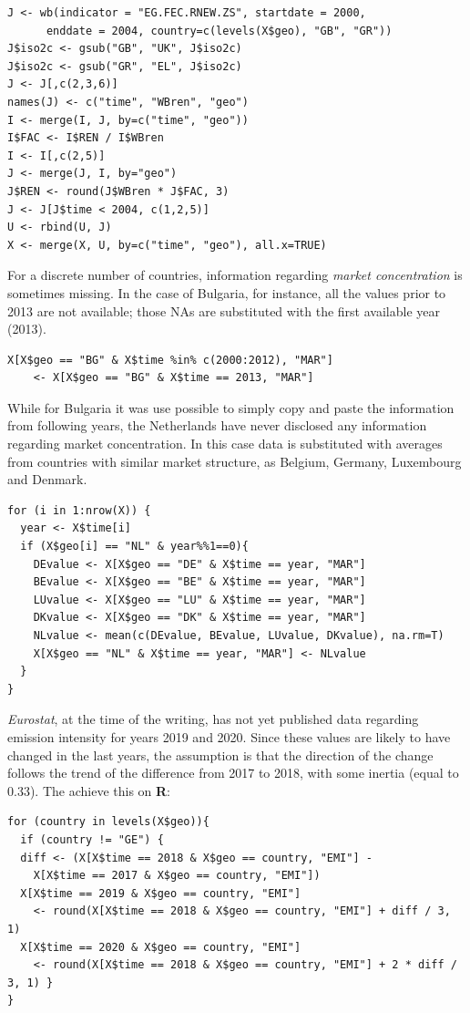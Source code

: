 \documentclass{book}
\begin{document}
\begin{appendices}
\begin{verbatim}
J <- wb(indicator = "EG.FEC.RNEW.ZS", startdate = 2000, 
	  enddate = 2004, country=c(levels(X$geo), "GB", "GR"))
J$iso2c <- gsub("GB", "UK", J$iso2c)
J$iso2c <- gsub("GR", "EL", J$iso2c)
J <- J[,c(2,3,6)]
names(J) <- c("time", "WBren", "geo")
I <- merge(I, J, by=c("time", "geo"))
I$FAC <- I$REN / I$WBren
I <- I[,c(2,5)]
J <- merge(J, I, by="geo")
J$REN <- round(J$WBren * J$FAC, 3)
J <- J[J$time < 2004, c(1,2,5)]
U <- rbind(U, J)
X <- merge(X, U, by=c("time", "geo"), all.x=TRUE)
\end{verbatim}

For a discrete number of countries, information regarding \textit{market concentration} is sometimes missing. In the case of Bulgaria, for instance, all the values prior to 2013 are not available; those NAs are substituted with the first available year (2013).

\begin{verbatim}
X[X$geo == "BG" & X$time %in% c(2000:2012), "MAR"] 
	<- X[X$geo == "BG" & X$time == 2013, "MAR"]
\end{verbatim}

While for Bulgaria it was use possible to simply copy and paste the information from following years, the Netherlands have never disclosed any information regarding market concentration. In this case data is substituted with averages from countries with similar market structure, as Belgium, Germany, Luxembourg and Denmark.

\begin{verbatim}
for (i in 1:nrow(X)) {
  year <- X$time[i]
  if (X$geo[i] == "NL" & year%%1==0){
    DEvalue <- X[X$geo == "DE" & X$time == year, "MAR"]
    BEvalue <- X[X$geo == "BE" & X$time == year, "MAR"]
    LUvalue <- X[X$geo == "LU" & X$time == year, "MAR"]
    DKvalue <- X[X$geo == "DK" & X$time == year, "MAR"]
    NLvalue <- mean(c(DEvalue, BEvalue, LUvalue, DKvalue), na.rm=T)
    X[X$geo == "NL" & X$time == year, "MAR"] <- NLvalue
  }
}
\end{verbatim}

\textit{Eurostat}, at the time of the writing, has not yet published data regarding emission intensity for years 2019 and 2020. Since these values are likely to have changed in the last years, the assumption is that the direction of the change follows the trend of the difference from 2017 to 2018, with some inertia (equal to 0.33). The achieve this on \textbf{R}:

\begin{verbatim}
for (country in levels(X$geo)){
  if (country != "GE") {
  diff <- (X[X$time == 2018 & X$geo == country, "EMI"] -
	X[X$time == 2017 & X$geo == country, "EMI"])
  X[X$time == 2019 & X$geo == country, "EMI"] 
	<- round(X[X$time == 2018 & X$geo == country, "EMI"] + diff / 3, 1)
  X[X$time == 2020 & X$geo == country, "EMI"]
	<- round(X[X$time == 2018 & X$geo == country, "EMI"] + 2 * diff / 3, 1) }
}
\end{verbatim}


\end{appendices}
\end{document}
